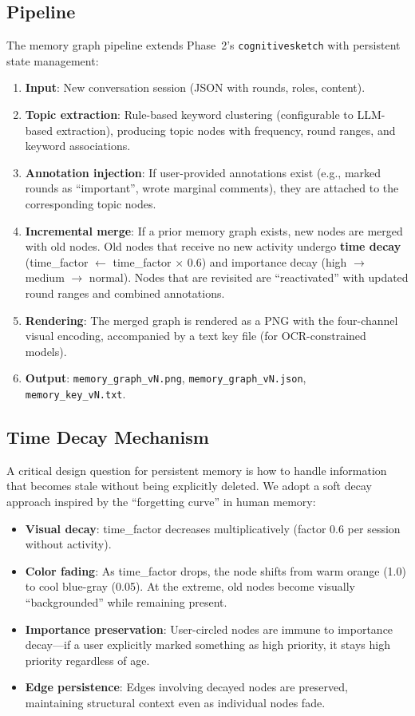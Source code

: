 \documentclass[11pt,a4paper]{article}
\begin{document}
\subsection{Pipeline}

The memory graph pipeline extends Phase~2's \texttt{cognitivesketch} with persistent state management:

\begin{enumerate}[nosep]
\item \textbf{Input}: New conversation session (JSON with rounds, roles, content).
\item \textbf{Topic extraction}: Rule-based keyword clustering (configurable to LLM-based extraction), producing topic nodes with frequency, round ranges, and keyword associations.
\item \textbf{Annotation injection}: If user-provided annotations exist (e.g., marked rounds as ``important'', wrote marginal comments), they are attached to the corresponding topic nodes.
\item \textbf{Incremental merge}: If a prior memory graph exists, new nodes are merged with old nodes. Old nodes that receive no new activity undergo \textbf{time decay} (time\_factor $\leftarrow$ time\_factor $\times$ 0.6) and importance decay (high $\rightarrow$ medium $\rightarrow$ normal). Nodes that are revisited are ``reactivated'' with updated round ranges and combined annotations.
\item \textbf{Rendering}: The merged graph is rendered as a PNG with the four-channel visual encoding, accompanied by a text key file (for OCR-constrained models).
\item \textbf{Output}: \texttt{memory\_graph\_vN.png}, \texttt{memory\_graph\_vN.json}, \texttt{memory\_key\_vN.txt}.
\end{enumerate}

\subsection{Time Decay Mechanism}

A critical design question for persistent memory is how to handle information that becomes stale without being explicitly deleted. We adopt a soft decay approach inspired by the ``forgetting curve'' in human memory:

\begin{itemize}[nosep]
\item \textbf{Visual decay}: time\_factor decreases multiplicatively (factor 0.6 per session without activity).
\item \textbf{Color fading}: As time\_factor drops, the node shifts from warm orange (1.0) to cool blue-gray (0.05). At the extreme, old nodes become visually ``backgrounded'' while remaining present.
\item \textbf{Importance preservation}: User-circled nodes are immune to importance decay---if a user explicitly marked something as high priority, it stays high priority regardless of age.
\item \textbf{Edge persistence}: Edges involving decayed nodes are preserved, maintaining structural context even as individual nodes fade.
\end{itemize}
\end{document}

